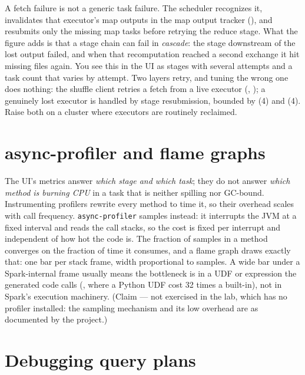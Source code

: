 A fetch failure is not a generic task failure. The scheduler recognizes it,
invalidates that executor's map outputs in the map output tracker
(), and resubmits only the missing map tasks
before retrying the reduce stage. What the figure adds is that a stage chain can
fail in \emph{cascade}: the stage downstream of the lost output failed, and when
that recomputation reached a second exchange it hit missing files again. You see
this in the UI as stages with several attempts and a task count that varies by
attempt. Two layers retry, and tuning the wrong one does nothing: the shuffle
client retries a fetch from a live executor (,
); a genuinely lost executor is handled by stage
resubmission, bounded by  (4) and
 (4). Raise both on a cluster where executors are
routinely reclaimed.

\section{async-profiler and flame graphs}
\label{sec:debug-profiler}

The UI's metrics answer \emph{which stage and which task}; they do not answer
\emph{which method is burning CPU} in a task that is neither spilling nor GC-bound.
Instrumenting profilers rewrite every method to time it, so their overhead scales
with call frequency. \texttt{async-profiler} samples instead: it interrupts the JVM
at a fixed interval and reads the call stacks, so the cost is fixed per interrupt
and independent of how hot the code is. The fraction of samples in a method
converges on the fraction of time it consumes, and a flame graph draws exactly that:
one bar per stack frame, width proportional to samples. A wide bar under a
Spark-internal frame usually means the bottleneck is in a UDF or expression the
generated code calls (, where a Python UDF cost 32 times a
built-in), not in Spark's execution machinery. (Claim --- not exercised in the
lab, which has no profiler installed: the sampling mechanism and its low overhead
are as documented by the project.)

\section{Debugging query plans}
\label{sec:debug-plans}


